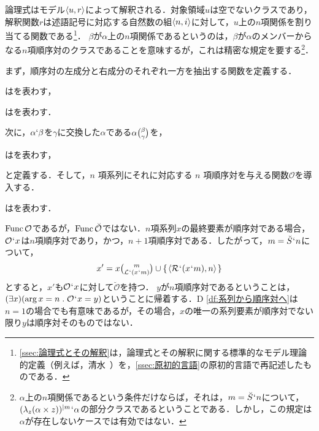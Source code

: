 論理式はモデル$\langle u,r \rangle$によって解釈される．対象領域$u$は空でないクラスであり，解釈関数$r$は述語記号に対応する自然数の組$\langle n,i \rangle$に対して，$ u $上の$ n $項関係を割り当てる関数である\footnote{
    \ref{ssec:論理式とその解釈}は，論理式とその解釈に関する標準的なモデル理論的定義（例えば，清水~\cite[pp.103-107]{清水}）を，\ref{ssec:原初的言語}の原初的言語で再記述したものである．
}．
$\beta$が$\alpha$上の$n$項関係であるというのは，$\beta$が$\alpha$のメンバーからなる$n$項順序対のクラスであることを意味するが，これは精密な規定を要する\footnote{
    $\alpha$上の$n$項関係であるという条件だけならば，それは，$m=\breve{S}{\mspace{1mu}{`}\mspace{1mu}} n$について，$ (\lambda_z(\alpha\times z))^{\mid m}{\mspace{1mu}{`}\mspace{1mu}} \alpha $の部分クラスであるということである．しかし，この規定は$\alpha$が存在しないケースでは有効ではない．
}．

まず，順序対の左成分と右成分のそれぞれ一方を抽出する関数を定義する．
\begin{df}
\label{df:左成分}
はを表わす，
\end{df}

\begin{df}
\label{df:右成分}
はを表わす．
\end{df}

\noindent 次に，$\alpha{`}\beta$を$\gamma$に交換した$\alpha$である$ \alpha \tbinom{\beta}{\gamma} $を，
\begin{df}
\label{df:系列要素の変換}
\kagi{$
    \alpha\tbinom{\beta}{\gamma}
$}は\kagi{$
    (\alpha\uphr\barl{\classab{\beta}})\cup\classab{\orp{\gamma,\beta}}
$}を表わす，
\end{df}
\noindent と定義する．そして，$ n $ 項系列にそれに対応する $ n $ 項順序対を与える関数$ \mathcal{O} $を導入する．

\begin{df}
\label{df:系列から順序対へ}
はを表わす．
\end{df}

\noindent $\operatorname{Func}{\mathcal{O}}$であるが，$\operatorname{Func}{\breve{\mathcal{O}}}$ではない．$n$項系列$x$の最終要素が順序対である場合，$\mathcal{O}{\mspace{1mu}{`}\mspace{1mu}} x$は$n$項順序対であり，かつ，$n+1$項順序対である．したがって，$m=\breve{S}{\mspace{1mu}{`}\mspace{1mu}} n$について，
\[
    x'= x\tbinom{m}{\mathcal{L}{\mspace{1mu}{`}\mspace{1mu}}(x{\mspace{1mu}{`}\mspace{1mu}} m)}\cup\{\mspace{2mu}\langle \mathcal{R}{\mspace{1mu}{`}\mspace{1mu}}(x{\mspace{1mu}{`}\mspace{1mu}} m),n \rangle\mspace{2mu}\}
\]
とすると，$x'$も$\mathcal{O}{\mspace{1mu}{`}\mspace{1mu}} x$に対して$\breve{\mathcal{O}}$を持つ．
$y$が$n$項順序対であるということは，$(\exists x)(\arg{x}=n\con{1}\mathcal{O}\fap x=y)$ということに帰着する．D \ref{df:系列から順序対へ}は$n=1$の場合でも有意味であるが，その場合，$x$の唯一の系列要素が順序対でない限り$y$は順序対そのものではない．

